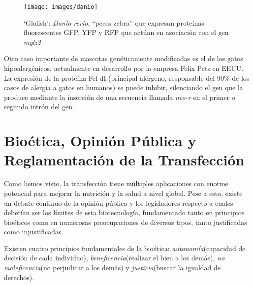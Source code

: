 \documentclass[fleqn,10pt]{SelfArx} %
\begin{document}
\begin{figure}[ht]\centering
\texttt{[image: images/danio]}
\caption{`Glofish': \textit{Danio rerio}, ``peces zebra'' que expresan proteínas fluorescentes GFP, YFP y RFP que actúan en asociación con el gen \textit{mylz2} \cite{gong2003development, fox2008fda}}
\end{figure}    
    
    Otro caso importante de mascotas genéticamente modificadas es el de los gatos hipoalergénicos, actualmente en desarrollo por la empresa Felix Pets en EEUU. La expresión de la proteína Fel-dI (principal alérgeno, responsable del 90\% de los casos de alergia a gatos en humanos) se puede inhibir, silenciando el gen que la produce mediante la inserción de una secuencia llamada \textit{neo-r} en el primer o segundo intrón del gen\cite{avner2012method, butt2012hypoallergenic}. 
  
\section{Bioética, Opinión Pública y Reglamentación de la Transfección }

Como hemos visto, la transfección tiene múltiples aplicaciones con enorme potencial para mejorar la nutrición y la salud a nivel global. Pese a esto, existe un debate continuo de la opinión pública y los legisladores respecto a cuales deberían ser los límites de esta biotecnología, fundamentado tanto en principios bioéticos como en numerosas preocupaciones de diversos tipos, tanto justificadas como injustificadas\cite{berkowitz1993food, berkowitz1994transgenic, mepham1998use, christiansen2000bioethics, Iredale, Cooley, Rowland, Verhoog2003294, Spink, Jefferson,lassen2006after, Ormandy}.

Existen cuatro principios fundamentales de la bioética: \textit{autonomía}(capacidad de decisión de cada individuo), \textit{beneficencia}(realizar el bien a los demás), \textit{no maleficencia}(no perjudicar a los demás) y \textit{justicia}(buscar la igualdad de derechos)\cite{Cooley, tsai2005bioethical}.
\end{document}
